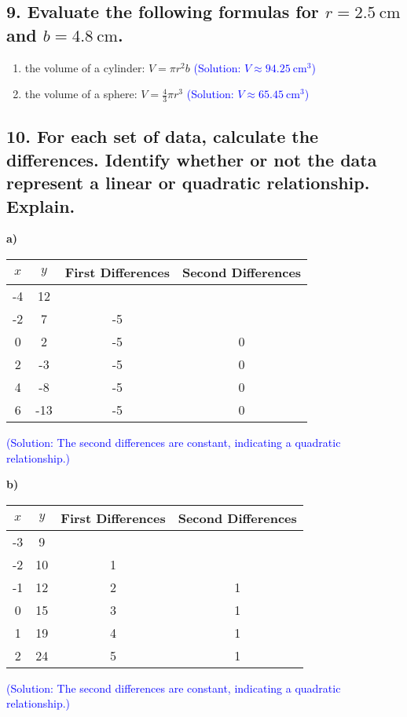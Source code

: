 \documentclass{article}
\begin{document}
\subsection*{9. Evaluate the following formulas for $r=2.5 \mathrm{~cm}$ and $b=4.8 \mathrm{~cm}$.}

\begin{enumerate}
    \item the volume of a cylinder: $V=\pi r^2 b$ \textcolor{blue}{(Solution: $V \approx 94.25 \mathrm{~cm}^3$)}
    \item the volume of a sphere: $V=\frac{4}{3} \pi r^3$ \textcolor{blue}{(Solution: $V \approx 65.45 \mathrm{~cm}^3$)}
\end{enumerate}


\subsection*{10. For each set of data, calculate the differences. Identify whether or not the data represent a linear or quadratic relationship. Explain.}

\textbf{a)}

\begin{center}
\begin{tabular}{|c|c|c|c|}
    \hline
    $x$ & $y$ & \textbf{First Differences} & \textbf{Second Differences} \\
    \hline
    -4 & 12 & & \\
    -2 & 7 & -5 & \\
    0 & 2 & -5 & 0 \\
    2 & -3 & -5 & 0 \\
    4 & -8 & -5 & 0 \\
    6 & -13 & -5 & 0 \\
    \hline
\end{tabular}

\textcolor{blue}{(Solution: The second differences are constant, indicating a quadratic relationship.)}
\end{center}

\textbf{b)}

\begin{center}
\begin{tabular}{|c|c|c|c|}
    \hline
    $x$ & $y$ & \textbf{First Differences} & \textbf{Second Differences} \\
    \hline
    -3 & 9 & & \\
    -2 & 10 & 1 & \\
    -1 & 12 & 2 & 1 \\
    0 & 15 & 3 & 1 \\
    1 & 19 & 4 & 1 \\
    2 & 24 & 5 & 1 \\
    \hline
\end{tabular}

\textcolor{blue}{(Solution: The second differences are constant, indicating a quadratic relationship.)}
\end{center}
\end{document}
